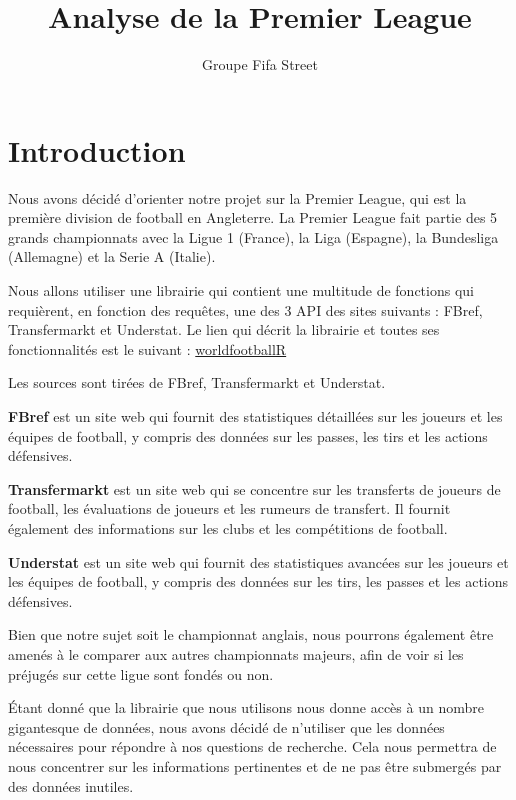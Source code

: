 \documentclass[
]{article}
\title{Analyse de la Premier League}
\author{Groupe Fifa Street}
\date{}
\begin{document}
\maketitle

\section{Introduction}\label{introduction}

Nous avons décidé d'orienter notre projet sur la Premier League, qui est
la première division de football en Angleterre. La Premier League fait
partie des 5 grands championnats avec la Ligue 1 (France), la Liga
(Espagne), la Bundesliga (Allemagne) et la Serie A (Italie).

Nous allons utiliser une librairie qui contient une multitude de
fonctions qui requièrent, en fonction des requêtes, une des 3 API des
sites suivants : FBref, Transfermarkt et Understat. Le lien qui décrit
la librairie et toutes ses fonctionnalités est le suivant :
\href{https://jaseziv.github.io/worldfootballR/articles/extract-fbref-data.html}{worldfootballR}

Les sources sont tirées de FBref, Transfermarkt et Understat.

\textbf{FBref} est un site web qui fournit des statistiques détaillées
sur les joueurs et les équipes de football, y compris des données sur
les passes, les tirs et les actions défensives.

\textbf{Transfermarkt} est un site web qui se concentre sur les
transferts de joueurs de football, les évaluations de joueurs et les
rumeurs de transfert. Il fournit également des informations sur les
clubs et les compétitions de football.

\textbf{Understat} est un site web qui fournit des statistiques avancées
sur les joueurs et les équipes de football, y compris des données sur
les tirs, les passes et les actions défensives.

Bien que notre sujet soit le championnat anglais, nous pourrons
également être amenés à le comparer aux autres championnats majeurs,
afin de voir si les préjugés sur cette ligue sont fondés ou non.

Étant donné que la librairie que nous utilisons nous donne accès à un
nombre gigantesque de données, nous avons décidé de n'utiliser que les
données nécessaires pour répondre à nos questions de recherche. Cela
nous permettra de nous concentrer sur les informations pertinentes et de
ne pas être submergés par des données inutiles.
\end{document}
